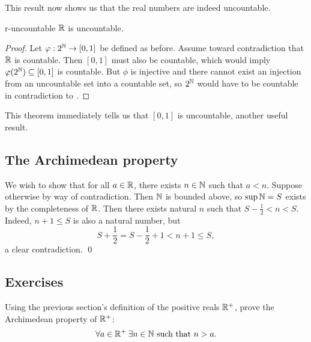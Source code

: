 \documentclass[master.tex]{subfiles}
\begin{document}
    This result now shows us that the real numbers are indeed uncountable.
    \begin{theorem}{}{r-uncountable}
        $\mathbb{R}$ is uncountable.
        \hr{}
        \begin{proof}
            Let $\varphi : 2^{\mathbb{N}} \rightarrow [0, 1]$ be defined as before.
            Assume toward contradiction that $\mathbb{R}$ is countable.
            Then $[0, 1]$ must also be countable, which would imply $\varphi(2^{\mathbb{N}}) \subseteq [0, 1]$ is countable.
            But $\phi$ is injective and there cannot exist an injection from an uncountable set into a countable set, so $2^{\mathbb{N}}$ would have to be countable in contradiction to .
        \end{proof}
    \end{theorem}
    This theorem immediately tells us that $[0, 1]$ is uncountable, another useful result.

    \subsection{The Archimedean property}
    We wish to show that for all $a \in \mathbb{R}$, there exists $n \in \mathbb{N}$ such that $a < n$.
    Suppose otherwise by way of contradiction.
    Then $\mathbb{N}$ is bounded above, so $\sup{\mathbb{N}} = S$ exists by the completeness of $\mathbb{R}$.
    Then there exists natural $n$ such that $S - \frac{1}{2} < n < S$.
    Indeed, $n + 1 \leq S$ is also a natural number, but
    \[
        S + \frac{1}{2} = S - \frac{1}{2} + 1 < n + 1 \leq S
    ,\]
    a clear contradiction. \qed


    \subsection*{Exercises}
    \begin{exercises}
        \item Using the previous section's definition of the positive reals $\mathbb{R}^{+}$, prove the Archimedean property of $\mathbb{R}^{+}$:
        \[
            \forall a \in \mathbb{R}^{+} \: \exists n \in \mathbb{N} \text{ such that } n > a
        .\]
    \end{exercises}
\end{document}
